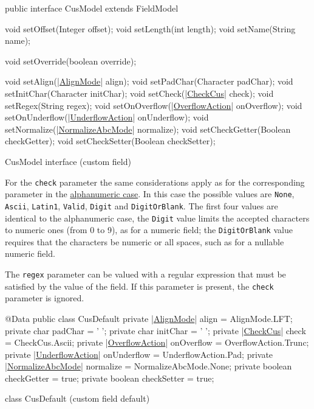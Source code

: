 \documentclass[a4paper,10pt]{report}
\newenvironment{elisting}[1][H]
  {\captionsetup{aboveskip=0pt}\begin{listing}[#1]}
  {\end{listing}%
}
\begin{document}
\begin{elisting}[!htb]
\begin{javacode}
public interface CusModel extends FieldModel {
    void setOffset(Integer offset);
    void setLength(int length);
    void setName(String name);
    
    void setOverride(boolean override);
    
    void setAlign(|\hyperref[lst:AlignMode]{AlignMode}| align);
    void setPadChar(Character padChar);
    void setInitChar(Character initChar);
    void setCheck(|\hyperref[lst:CheckCus]{CheckCus}| check);
    void setRegex(String regex);
    void setOnOverflow(|\hyperref[lst:OverflowAction]{OverflowAction}| onOverflow);
    void setOnUnderflow(|\hyperref[lst:UnderflowAction]{UnderflowAction}| onUnderflow);
    void setNormalize(|\hyperref[lst:NormalizeAbcMode]{NormalizeAbcMode}| normalize);
    void setCheckGetter(Boolean checkGetter);
    void setCheckSetter(Boolean checkSetter);
}
\end{javacode}
\caption{CusModel interface (custom field)}
\label{lst:CusModel}
\end{elisting}

For the \verb!check! parameter the same considerations apply as for the 
corresponding parameter in the \hyperlink{abc:chk}{alphanumeric case}. 
In this case the possible values are \verb!None!, \verb!Ascii!, \verb!Latin1!, 
\verb!Valid!, \verb!Digit! and \verb!DigitOrBlank!. 
The first four values are identical to the alphanumeric case, the \verb!Digit! 
value limits the accepted characters to numeric ones (from 0 to 9), as for a 
numeric field; the \verb!DigitOrBlank! value requires that the characters be 
numeric or all spaces, such as for a nullable numeric field.

The \verb!regex! parameter can be valued with a regular expression that must be 
satisfied by the value of the field. If this parameter is present, the 
\verb!check! parameter is ignored.

\begin{elisting}[!htb]
\begin{javacode}
@Data
public class CusDefault {
    private |\hyperref[lst:AlignMode]{AlignMode}| align = AlignMode.LFT;
    private char padChar = ' ';
    private char initChar = ' ';
    private |\hyperref[lst:CheckCus]{CheckCus}| check = CheckCus.Ascii;
    private |\hyperref[lst:OverflowAction]{OverflowAction}| onOverflow = OverflowAction.Trunc;
    private |\hyperref[lst:UnderflowAction]{UnderflowAction}| onUnderflow = UnderflowAction.Pad;
    private |\hyperref[lst:NormalizeAbcMode]{NormalizeAbcMode}| normalize = NormalizeAbcMode.None;
    private boolean checkGetter = true;
    private boolean checkSetter = true;
}
\end{javacode}
\caption{class CusDefault (custom field default)}
\label{lst:CusDefault}
\end{elisting}
\end{document}
